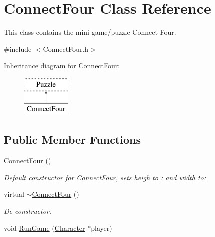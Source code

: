 \hypertarget{classConnectFour}{\section{Connect\-Four Class Reference}
\label{classConnectFour}
}


This class contains the mini-\/game/puzzle Connect Four.  




{\ttfamily \#include $<$Connect\-Four.\-h$>$}

Inheritance diagram for Connect\-Four\-:\begin{figure}[H]
\begin{center}
\leavevmode
\includegraphics[height=2.000000cm]{classConnectFour}
\end{center}
\end{figure}
\subsection*{Public Member Functions}
\begin{DoxyCompactItemize}
\item 
\hyperlink{classConnectFour_a9d7a0db424f22513386fa60ed2d5b575}{Connect\-Four} ()
\begin{DoxyCompactList}\small\item\em Default constructor for \hyperlink{classConnectFour}{Connect\-Four}, sets heigh to \-: and width to\-: \end{DoxyCompactList}\item 
virtual \hyperlink{classConnectFour_ae7d414d7f7f694fd427bfeaef80bd1f9}{$\sim$\-Connect\-Four} ()
\begin{DoxyCompactList}\small\item\em De-\/constructor. \end{DoxyCompactList}\item 
void \hyperlink{classConnectFour_a3b578d1126bc575fa23b8811f121c8be}{Run\-Game} (\hyperlink{classCharacter}{Character} $\ast$player)
\end{DoxyCompactItemize}
